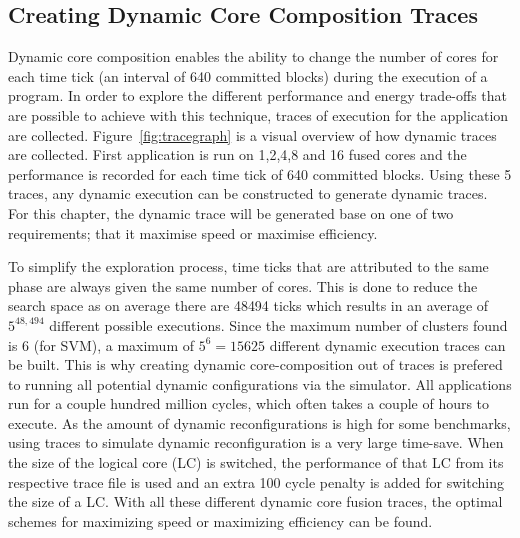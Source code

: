 \subsection{Creating Dynamic Core Composition Traces}

Dynamic core composition enables the ability to change the number of cores for each time tick (an interval of 640 committed blocks) during the execution of a program.
In order to explore the different performance and energy trade-offs that are possible to achieve with this technique, traces of execution for the application are collected.
Figure~\ref{fig:tracegraph} is a visual overview of how dynamic traces are collected.
First application is run on 1,2,4,8 and 16 fused cores and the performance is recorded for each time tick of 640 committed blocks.
Using these 5 traces, any dynamic execution can be constructed to generate dynamic traces.
For this chapter, the dynamic trace will be generated base on one of two requirements; that it maximise speed or maximise efficiency.

To simplify the exploration process, time ticks that are attributed to the same phase are always given the same number of cores.
This is done to reduce the search space as on average there are 48494 ticks which results in an average of $5^{48,494}$ different possible executions.
Since the maximum number of clusters found is 6 (for SVM), a maximum of $5^{6} = 15625$ different dynamic execution traces can be built.
This is why creating dynamic core-composition out of traces is prefered to running all potential dynamic configurations via the simulator.
All applications run for a couple hundred million cycles, which often takes a couple of hours to execute.
As the amount of dynamic reconfigurations is high for some benchmarks, using traces to simulate dynamic reconfiguration is a very large time-save.
When the size of the logical core (LC) is switched, the performance of that LC from its respective trace file is used and an extra 100 cycle penalty is added for switching the size of a LC.
With all these different dynamic core fusion traces, the optimal schemes for maximizing speed or maximizing efficiency can be found.

